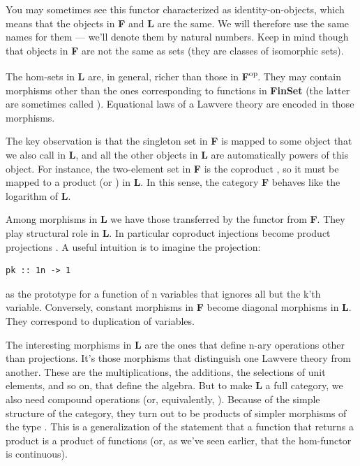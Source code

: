 You may sometimes see this functor characterized as identity-on-objects,
which means that the objects in \textbf{F} and \textbf{L} are the same.
We will therefore use the same names for them --- we'll denote them by
natural numbers. Keep in mind though that objects in \textbf{F} are not
the same as sets (they are classes of isomorphic sets).

The hom-sets in \textbf{L} are, in general, richer than those in
\textbf{F}\textsuperscript{op}. They may contain morphisms other than
the ones corresponding to functions in \textbf{FinSet} (the latter are
sometimes called ). Equational laws of a
Lawvere theory are encoded in those morphisms.

The key observation is that the singleton set  in \textbf{F}
is mapped to some object that we also call  in \textbf{L}, and
all the other objects in \textbf{L} are automatically powers of this
object. For instance, the two-element set  in \textbf{F} is
the coproduct , so it must be mapped to a product
 (or ) in \textbf{L}. In this sense, the category
\textbf{F} behaves like the logarithm of \textbf{L}.

Among morphisms in \textbf{L} we have those transferred by the functor
 from \textbf{F}. They play structural role in \textbf{L}. In
particular coproduct injections  become product projections
. A useful intuition is to imagine the projection:

\begin{verbatim}
pk :: 1n -> 1
\end{verbatim}

as the prototype for a function of n variables that ignores all but the
k'th variable. Conversely, constant morphisms 
in \textbf{F} become diagonal morphisms  in
\textbf{L}. They correspond to duplication of variables.

The interesting morphisms in \textbf{L} are the ones that define n-ary
operations other than projections. It's those morphisms that distinguish
one Lawvere theory from another. These are the multiplications, the
additions, the selections of unit elements, and so on, that define the
algebra. But to make \textbf{L} a full category, we also need compound
operations  (or, equivalently,
). Because of the simple structure of
the category, they turn out to be products of simpler morphisms of the
type . This is a generalization of the
statement that a function that returns a product is a product of
functions (or, as we've seen earlier, that the hom-functor is
continuous).

